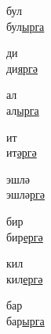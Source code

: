 \begin{multicols}{4}
\begin{enumerate}
\begin{minipage}{\linewidth}
    \item
    бул\\
    бул\underline{ыр}\underline{га}\\
\end{minipage}

\begin{minipage}{\linewidth}
    \item
    ди\\
    ди\underline{яр}\underline{гә}\\
\end{minipage}

\begin{minipage}{\linewidth}
    \item
    ал\\
    ал\underline{ыр}\underline{га}\\
\end{minipage}

\begin{minipage}{\linewidth}
    \item
    ит\\
    ит\underline{әр}\underline{гә}\\
\end{minipage}

\begin{minipage}{\linewidth}
    \item
    эшлә\\
    эшлә\underline{р}\underline{гә}\\
\end{minipage}

\begin{minipage}{\linewidth}
    \item
    бир\\
    бир\underline{ер}\underline{гә}\\
\end{minipage}

\begin{minipage}{\linewidth}
    \item
    кил\\
    кил\underline{ер}\underline{гә}\\
\end{minipage}

\begin{minipage}{\linewidth}
    \item
    бар\\
    бар\underline{ыр}\underline{га}\\
\end{minipage}


\end{enumerate}
\end{multicols}
